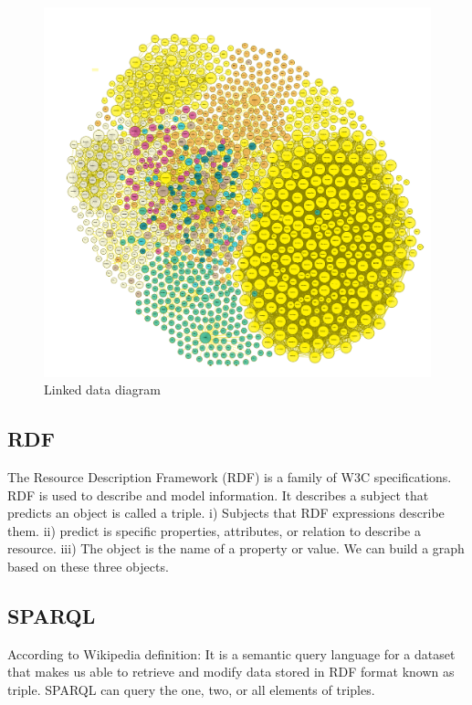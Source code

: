 \begin{center}
	\begin{figure}[htb!]
		
		\begin{minipage}{0.55\linewidth}
			\centering
			\includegraphics[width=1.55\textwidth]{images/chap02_LinkData.png}
		\end{minipage}
		\caption[Linked data diagram]{Linked data diagram\cite{Hector}}
		
		
	\end{figure}
	
\end{center}
\subsection{RDF}
The Resource Description Framework (RDF) is a family of W3C specifications. RDF is used to describe and model information. It describes a subject that predicts an object is called a triple.
i) Subjects that RDF expressions describe them.
ii) predict is specific properties, attributes, or relation to describe a resource.
iii) The object is the name of a property or value.
We can build a graph based on these three objects\cite{Hector}.

\subsection{SPARQL}
According to Wikipedia definition: It is a semantic query language for a dataset that makes us able to retrieve and modify data stored in RDF format known as triple. SPARQL can query the one, two, or all elements of triples.    

